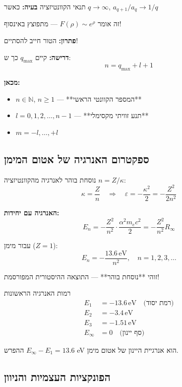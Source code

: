 \begin{importantbox}{תנאי הקוונטיזציה}
\textbf{בעיה:} כאשר $q \to \infty$, $a_{q+1}/a_q \to 1/q$

זה אומר $F(\rho) \sim e^\rho$ — מתפוצץ באינסוף! \xmark

\textbf{פתרון:} הטור חייב להסתיים!

\textbf{דרישה:} קיים $q_{\max}$ כך ש:
\[
n = q_{\max} + l + 1
\]

\textbf{מכאן:}
\begin{itemize}
    \item $n \in \mathbb{N}$, $n \geq 1$ — **המספר הקוונטי הראשי**
    \item $l = 0, 1, 2, \ldots, n-1$ — **תנע זוויתי מקסימלי**
    \item $m = -l, \ldots, +l$
\end{itemize}
\end{importantbox}

\subsection{ספקטרום האנרגיה של אטום המימן}

\begin{theorembox}{נוסחת בוהר לאנרגיה}
מהקוונטיזציה $n = Z/\kappa$:
\[
\kappa = \frac{Z}{n} \quad \Rightarrow \quad \varepsilon = -\frac{\kappa^2}{2} = -\frac{Z^2}{2n^2}
\]

\textbf{האנרגיה עם יחידות:}
\[
E_n = -\frac{Z^2}{n^2} \cdot \frac{\alpha^2 m_e c^2}{2} = -\frac{Z^2}{n^2} R_\infty
\]

עבור מימן ($Z=1$):
\[
\boxed{E_n = -\frac{13.6 \, \text{eV}}{n^2}, \quad n = 1, 2, 3, \ldots}
\]

זוהי **נוסחת בוהר** — התוצאה ההיסטורית המפורסמת!
\end{theorembox}

\begin{examplebox}{רמות האנרגיה הראשונות}
\begin{align*}
E_1 &= -13.6 \, \text{eV} \quad \text{(רמת יסוד)} \\
E_2 &= -3.4 \, \text{eV} \\
E_3 &= -1.51 \, \text{eV} \\
E_\infty &= 0 \quad \text{(סף יינון)}
\end{align*}

ההפרש $E_\infty - E_1 = 13.6$ eV הוא אנרגיית היינון של אטום מימן.
\end{examplebox}

\subsection{הפונקציות העצמיות והניוון}

